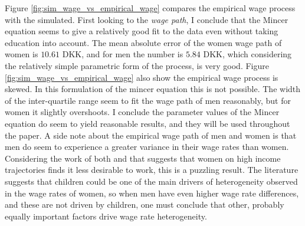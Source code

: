 Figure \ref{fig:sim_wage_vs_empirical_wage} compares the empirical wage process with the simulated. First looking to the \textit{wage path}, I conclude that the Mincer equation seems to give a relatively good fit to the data even without taking education into account. The mean absolute error of the women wage path of women is $10.61$ DKK, and for men the number is $5.84$ DKK, which considering the relatively simple parametric form of the process, is very good. Figure \ref{fig:sim_wage_vs_empirical_wage} also  show the empirical wage process is skewed. In this formulation of the mincer equation this is not possible. The width of the inter-quartile range seem to fit the wage path of men reasonably, but for women it slightly overshoots. I conclude the parameter values of the Mincer equation do seem to yield reasonable results, and they will be used throughout the paper. A side note about the empirical wage path of men and women is that men do seem to experience a greater variance in their wage rates than women. Considering the work of both \textcite{francesconi_joint_2002} and \textcite{gayle_life-cyle_2006} that suggests that women on high income trajectories finds it less desirable to work, this is a puzzling result. The literature suggests that children could be one of the main drivers of heterogeneity observed in the wage rates of women, so when men have even higher wage rate differences, and these are not driven by children, one must conclude that other, probably equally important factors drive wage rate heterogeneity.

